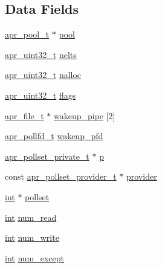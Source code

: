 \subsection*{Data Fields}
\begin{DoxyCompactItemize}
\item 
\hyperlink{structapr__pool__t}{apr\+\_\+pool\+\_\+t} $\ast$ \hyperlink{structapr__pollset__t_af9b340dfee1237e5d5c5df6db819e87c}{pool}
\item 
\hyperlink{group__apr__platform_ga558548a135d8a816c4787250744ea147}{apr\+\_\+uint32\+\_\+t} \hyperlink{structapr__pollset__t_afa5ce82ebfc480df8a2002c5072b4c71}{nelts}
\item 
\hyperlink{group__apr__platform_ga558548a135d8a816c4787250744ea147}{apr\+\_\+uint32\+\_\+t} \hyperlink{structapr__pollset__t_a107c3285970d13930688710dc22cefc4}{nalloc}
\item 
\hyperlink{group__apr__platform_ga558548a135d8a816c4787250744ea147}{apr\+\_\+uint32\+\_\+t} \hyperlink{structapr__pollset__t_a7c5a54ea97e85835914486a1fed9ea90}{flags}
\item 
\hyperlink{structapr__file__t}{apr\+\_\+file\+\_\+t} $\ast$ \hyperlink{structapr__pollset__t_a21a78faacdf6e329c9333220a3b69307}{wakeup\+\_\+pipe} \mbox{[}2\mbox{]}
\item 
\hyperlink{structapr__pollfd__t}{apr\+\_\+pollfd\+\_\+t} \hyperlink{structapr__pollset__t_ab7f6b91ff333eeb4911ab41c44d3344a}{wakeup\+\_\+pfd}
\item 
\hyperlink{structapr__pollset__private__t}{apr\+\_\+pollset\+\_\+private\+\_\+t} $\ast$ \hyperlink{structapr__pollset__t_a3f8411536cd6a23826a9cebf1328dddf}{p}
\item 
const \hyperlink{structapr__pollset__provider__t}{apr\+\_\+pollset\+\_\+provider\+\_\+t} $\ast$ \hyperlink{structapr__pollset__t_a229a818838e66f79744539233d326bd0}{provider}
\item 
\hyperlink{pcre_8txt_a42dfa4ff673c82d8efe7144098fbc198}{int} $\ast$ \hyperlink{structapr__pollset__t_a540fcf5810832d74db2cec3efc96fe51}{pollset}
\item 
\hyperlink{pcre_8txt_a42dfa4ff673c82d8efe7144098fbc198}{int} \hyperlink{structapr__pollset__t_ae9327d04403d824578e9de4a649ff838}{num\+\_\+read}
\item 
\hyperlink{pcre_8txt_a42dfa4ff673c82d8efe7144098fbc198}{int} \hyperlink{structapr__pollset__t_aaab127f16d4d59ab3cfc0b891aec04ca}{num\+\_\+write}
\item 
\hyperlink{pcre_8txt_a42dfa4ff673c82d8efe7144098fbc198}{int} \hyperlink{structapr__pollset__t_a8620797ddcf7ed3dbd3728e456fad809}{num\+\_\+except}

\end{DoxyCompactItemize}

